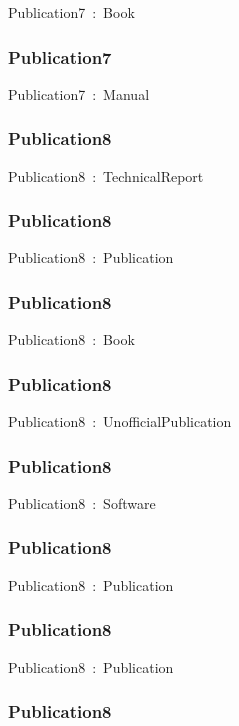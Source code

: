 \documentclass{article}
\begin{document}
Publication7~:~Book

\subsubsection*{Publication7}

Publication7~:~Manual

\subsubsection*{Publication8}

Publication8~:~TechnicalReport

\subsubsection*{Publication8}

Publication8~:~Publication

\subsubsection*{Publication8}

Publication8~:~Book

\subsubsection*{Publication8}

Publication8~:~UnofficialPublication

\subsubsection*{Publication8}

Publication8~:~Software

\subsubsection*{Publication8}

Publication8~:~Publication

\subsubsection*{Publication8}

Publication8~:~Publication

\subsubsection*{Publication8}
\end{document}
